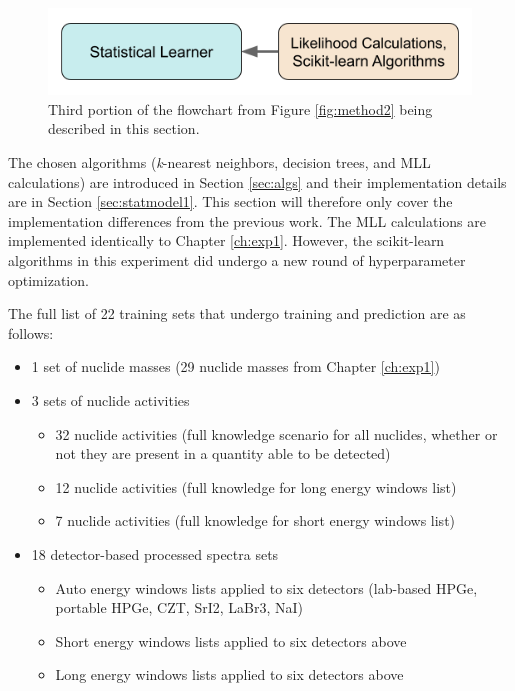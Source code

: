 
\begin{figure}[H]
  \centering
  \includegraphics[width=0.7\linewidth]{./chapters/exp2/methodology2_3.png}
  \caption[Third portion of the flowchart from Figure \ref{fig:method2}]
          {Third portion of the flowchart from Figure \ref{fig:method2} being 
           described in this section.}
\end{figure}

The chosen algorithms (\textit{k}-nearest neighbors, decision trees, and
\gls{MLL} calculations) are introduced in Section \ref{sec:algs} and their
implementation details are in Section \ref{sec:statmodel1}.  This section will
therefore only cover the implementation differences from the previous work.
The \gls{MLL} calculations are implemented identically to Chapter
\ref{ch:exp1}.  However, the scikit-learn algorithms in this experiment did
undergo a new round of hyperparameter optimization.

The full list of 22 training sets that undergo training and prediction are as
follows: 
\begin{itemize}
  \item 1 set of nuclide masses (29 nuclide masses from Chapter \ref{ch:exp1})
  \item 3 sets of nuclide activities
    \begin{itemize}
      \item 32 nuclide activities (full knowledge scenario for all nuclides, 
            whether or not they are present in a quantity able to be detected)
      \item 12 nuclide activities (full knowledge for long energy windows list)
      \item 7 nuclide activities (full knowledge for short energy windows list)
    \end{itemize}
  \item 18 detector-based processed spectra sets
    \begin{itemize}
      \item Auto energy windows lists applied to six detectors (lab-based 
            \gls{HPGe}, portable \gls{HPGe}, \gls{CZT}, \gls{SrI2}, \gls{LaBr3}, 
            \gls{NaI})
      \item Short energy windows lists applied to six detectors above
      \item Long energy windows lists applied to six detectors above
    \end{itemize}
\end{itemize}


